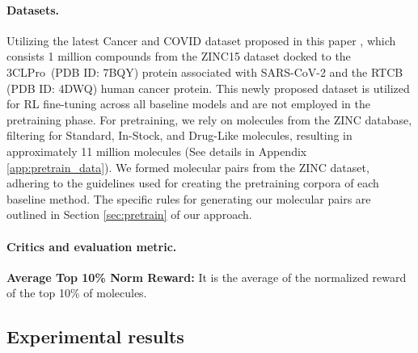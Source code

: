 \paragraph{Datasets.}
{Utilizing the latest Cancer and COVID dataset proposed in this paper , which consists 1 million compounds from the ZINC15 dataset docked to the 3CLPro~(PDB ID: 7BQY) protein associated with SARS-CoV-2 and the RTCB (PDB ID: 4DWQ) human cancer protein.}
This newly proposed dataset is utilized for RL fine-tuning across all baseline models and are not employed in the pretraining phase. 
For pretraining, we rely on molecules from the ZINC database, filtering for Standard, In-Stock, and Drug-Like molecules, resulting in approximately 11 million molecules (See details in Appendix \ref{app:pretrain_data}). We formed molecular pairs from the ZINC dataset, adhering to the guidelines used for creating the pretraining corpora of each baseline method. The specific rules for generating our molecular pairs are outlined in Section \ref{sec:pretrain} of our approach.








\paragraph{Critics and evaluation metric.} 
{
\textbf{Average Top 10\% Norm Reward:} It is the average of the normalized reward of the top 10\% of molecules.
}



\subsection{Experimental results}









        
    

